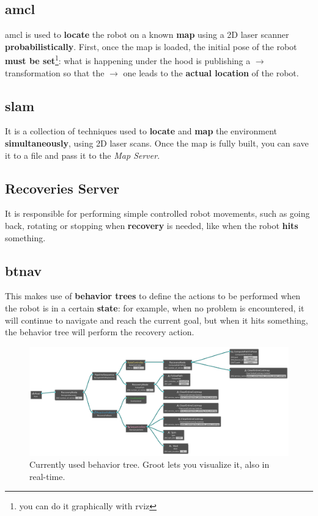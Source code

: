 \subsection{\acrfull{amcl}}

\acrshort{amcl} is used to \textbf{locate} the robot on a known \textbf{map} using a 2D laser scanner \textbf{probabilistically}. First, once the map is loaded, the initial pose of the robot \textbf{must be set}\footnote{you can do it graphically with \acrshort{rviz}}: what is happening under the hood is publishing a  $\rightarrow$  transformation so that the  $\rightarrow$  one leads to the \textbf{actual location} of the robot.

\subsection{\acrfull{slam}}

It is a collection of techniques used to \textbf{locate} and \textbf{map} the environment \textbf{simultaneously}, using 2D laser scans\cite{slam}. Once the map is fully built, you can save it to a file and pass it to the \textit{Map Server}.

\subsection{Recoveries Server}

It is responsible for performing simple controlled robot movements, such as going back, rotating or stopping when \textbf{recovery} is needed, like when the robot \textbf{hits} something.

\subsection{\acrfull{btnav}}

This makes use of \textbf{behavior trees} to define the actions to be performed when the robot is in a certain \textbf{state}: for example, when no problem is encountered, it will continue to navigate and reach the current goal, but when it hits something, the behavior tree will perform the recovery action.

\begin{figure}[h]
    \centering
    \includegraphics[width=\textwidth]{images/bt-alpha.png}
    \caption{Currently used behavior tree. Groot lets you visualize it, also in real-time\cite{groot}.}
\end{figure}

